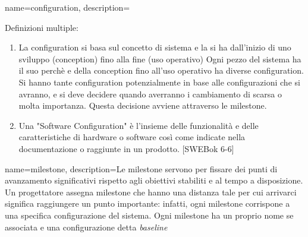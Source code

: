 {
name=configuration,
description={Definizioni multiple:
\begin{enumerate}
\item La configuration si basa sul concetto di sistema e la si ha dall'inizio di uno sviluppo (conception) fino alla fine (uso operativo) Ogni pezzo del sistema ha il suo perch\`e e della conception fino all'uso operativo ha diverse configuration. Si hanno tante configuration  potenzialmente in base alle configurazioni che si avranno, e si deve decidere quando averranno i cambiamento di scarsa o molta importanza. Questa decisione avviene attraverso le milestone.
\item Una "Software Configuration" \`e l'insieme delle funzionalità e delle caratteristiche di hardware o software cos\`i come indicate nella documentazione o raggiunte in un prodotto. [SWEBok 6-6]
\end{enumerate}
}
}




{
name=milestone,
description={Le milestone servono per fissare dei punti di avanzamento significativi rispetto agli obiettivi stabiliti e al tempo a disposizione.
Un progettatore assegna milestone che hanno una distanza tale per cui arrivarci significa raggiungere un punto importante: infatti, ogni milestone corrispone a una specifica configurazione del sistema.
Ogni milestone ha un proprio nome se associata e una configurazione detta \textit{baseline}}
}

